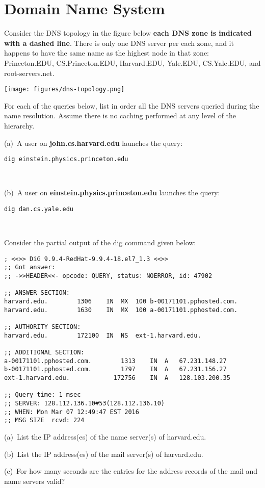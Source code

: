 \section{Domain Name System}

  Consider the  DNS  topology  in the  figure  below
{\bf each DNS  zone is indicated with  a dashed line}. There  is only
one DNS server per each zone, and  it happens to have the same name as
the  highest  node  in  that  zone:  Princeton.EDU,  CS.Princeton.EDU,
Harvard.EDU, Yale.EDU, CS.Yale.EDU, and root-servers.net. 

\begin{center}
  \texttt{[image: figures/dns-topology.png]}
\end{center}

For  each of  the queries  below, list in order  all the  DNS servers
queried  during the  name  resolution. Assume  there  is no  caching
performed at any level of the hierarchy.

(a)~A  user  on   {\bf
  john.cs.harvard.edu} launches the query:

\centerline{\tt dig einstein.physics.princeton.edu}
\vspace{-5mm}
~\ansbelow
\vspace{1.25in}

(b)~A user on {\bf einstein.physics.princeton.edu} launches the query:

\centerline{\tt dig dan.cs.yale.edu}
\vspace{-5mm}
~\ansbelow
\vspace{1.25in}


\eprob

\pagebreak

 Consider the partial output of the dig command given below:
\begin{verbatim}
; <<>> DiG 9.9.4-RedHat-9.9.4-18.el7_1.3 <<>> 
;; Got answer:
;; ->>HEADER<<- opcode: QUERY, status: NOERROR, id: 47902

;; ANSWER SECTION:
harvard.edu.		1306	IN	MX	100 b-00171101.pphosted.com.
harvard.edu.		1630	IN	MX	100 a-00171101.pphosted.com.

;; AUTHORITY SECTION:
harvard.edu.		172100	IN	NS	ext-1.harvard.edu.

;; ADDITIONAL SECTION:
a-00171101.pphosted.com.        1313    IN	A	67.231.148.27
b-00171101.pphosted.com.        1797    IN	A	67.231.156.27
ext-1.harvard.edu.            172756    IN	A	128.103.200.35

;; Query time: 1 msec
;; SERVER: 128.112.136.10#53(128.112.136.10)
;; WHEN: Mon Mar 07 12:49:47 EST 2016
;; MSG SIZE  rcvd: 224
\end{verbatim}

(a)~List the IP address(es) of the name server(s) of harvard.edu.
~\ansbelow
\vspace{1in}


(b)~List the IP address(es) of the mail server(s) of harvard.edu.
~\ansbelow
\vspace{1in}


(c)~For how  many seconds are the  entries for the address  records of
the mail and name servers valid?
~\ansbelow
\vspace{1.15in}


\eprob
